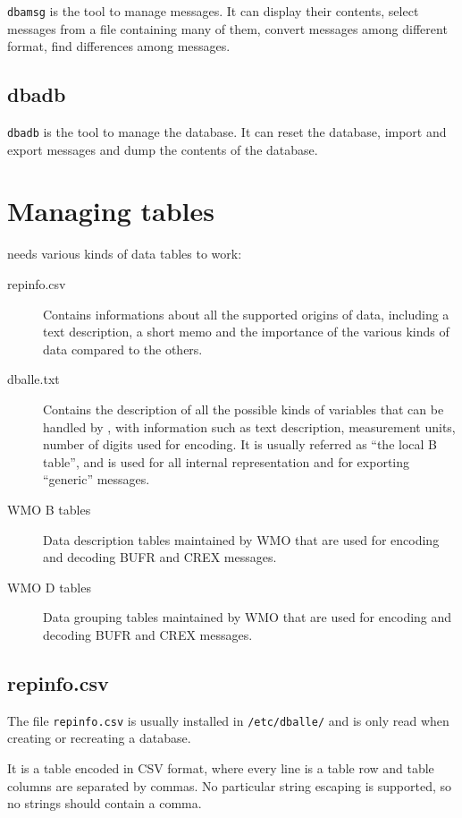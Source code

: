 {\tt dbamsg} is the tool to manage messages.  It can display their contents,
select messages from a file containing many of them, convert messages among
different format, find differences among messages.

\subsection{dbadb}

{\tt dbadb} is the tool to manage the \dballe{} database.  It can reset the
database, import and export messages and dump the contents of the database.

\section {Managing tables}

\dballe{} needs various kinds of data tables to work:

\begin{description}
\item[repinfo.csv]
  Contains informations about all the supported origins of data, including a
  text description, a short memo and the importance of the various kinds of
  data compared to the others.
\item[dballe.txt]
  Contains the description of all the possible kinds of variables that can be
  handled by \dballe{}, with information such as text description, measurement
  units, number of digits used for encoding.  It is usually referred as ``the
  local B table'', and is used for all internal representation and for
  exporting ``generic'' messages.
\item[WMO B tables]
  Data description tables maintained by WMO that are used for encoding and
  decoding BUFR and CREX messages.
\item[WMO D tables]
  Data grouping tables maintained by WMO that are used for encoding and
  decoding BUFR and CREX messages.
\end{description}

\subsection{repinfo.csv}

The file {\tt repinfo.csv} is usually installed in {\tt /etc/dballe/} and is
only read when creating or recreating a database.

It is a table encoded in CSV format, where every line is a table row and table
columns are separated by commas.  No particular string escaping is supported,
so no strings should contain a comma.

